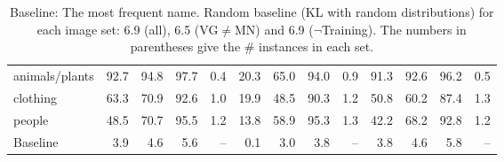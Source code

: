\begin{table*}
\begin{tabular}{l@{~}|@{~}r@{~}r@{~}rr@{~}|@{~}r@{~}r@{~}rr@{~}|@{~}r@{~}r@{~}rr}
		animals/plants &               92.7 &                 94.8 &                   97.7 &            0.4 &            20.3 &              65.0 &                94.0 &         0.9 &             91.3 &               92.6 &                 96.2 &          0.5 \\
		clothing       &               63.3 &                 70.9 &                   92.6 &            1.0 &            19.9 &              48.5 &                90.3 &         1.2 &             50.8 &               60.2 &                 87.4 &          1.3 \\
		people         &               48.5 &                 70.7 &                   95.5 &            1.2 &            13.8 &              58.9 &                95.3 &         1.3 &             42.2 &               68.2 &                 92.8 &          1.2 \\
		\bottomrule
		Baseline       &                3.9 &                  4.6 &                    5.6 &            -- &             0.1 &               3.0 &                 3.8 &         -- &              3.8 &                4.6 &                  5.8 &          -- \\
	\end{tabular}
	\caption{Baseline: The most frequent name. Random baseline (KL with random distributions) for each image set: 6.9 (all), 6.5 (VG$\neq$MN) and 6.9 ($\neg$Training). The numbers in parentheses give the \# instances in each set.	\label{tab:model}}
\end{table*}
%

